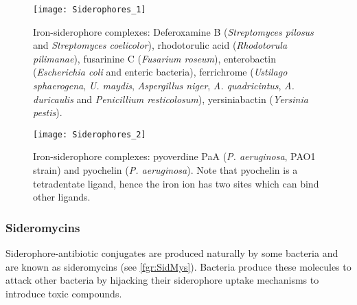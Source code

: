 \begin{figure}[H]
	\begin{center}
		\texttt{[image: Siderophores\_1]}
		\caption{Iron-siderophore complexes:
		Deferoxamine B \cite{Zheng2012} (\textit{Streptomyces pilosus} and \textit{Streptomyces coelicolor}), 
		rhodotorulic acid \cite{Carrano1978} (\textit{Rhodotorula pilimanae}),
		fusarinine C \cite{Hossain1980} (\textit{Fusarium roseum}),
		enterobactin \cite{Zheng2012} (\textit{Escherichia coli} and enteric bacteria),
		ferrichrome \cite{vanderHelm1980} (\textit{Ustilago sphaerogena}, \textit{U. maydis}, \textit{Aspergillus niger}, \textit{A. quadricintus}, \textit{A. duricaulis} and \textit{Penicillium resticolosum}),
		yersiniabactin \cite{Zheng2012} (\textit{Yersinia pestis}).
		\label{fgr:Sids}}
	\end{center}
\end{figure}

\begin{figure}[H]
	\begin{center}
		\texttt{[image: Siderophores\_2]}
		\caption{Iron-siderophore complexes:
		pyoverdine PaA \cite{Zheng2012,Meyer2000} (\textit{P. aeruginosa}, PAO1 strain) and pyochelin \cite{Schlegel2006,Cobessi2005} (\textit{P. aeruginosa}). 
		Note that pyochelin  is a tetradentate ligand, hence the iron ion has two sites which can bind other ligands. \label{fgr:Sids_2}}
	\end{center}
\end{figure}

\subsubsection{Sideromycins}

Siderophore-antibiotic conjugates are produced naturally by some bacteria and are known as sideromycins\cite{Page2013} (see \ref{fgr:SidMys}). Bacteria produce these molecules to attack other bacteria by hijacking their siderophore uptake mechanisms to introduce toxic compounds. 

